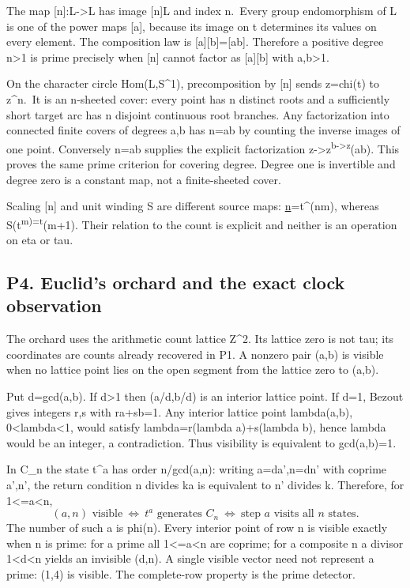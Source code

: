 \documentclass[
  11pt,
]{article}
\begin{document}
The map {[}n{]}:L-\textgreater L has image {[}n{]}L and index n.~Every
group endomorphism of L is one of the power maps {[}a{]}, because its
image on t determines its values on every element. The composition law
is {[}a{]}{[}b{]}={[}ab{]}. Therefore a positive degree n\textgreater1
is prime precisely when {[}n{]} cannot factor as {[}a{]}{[}b{]} with
a,b\textgreater1.

On the character circle Hom(L,S\^{}1), precomposition by {[}n{]} sends
z=chi(t) to z\^{}n.~It is an n-sheeted cover: every point has n distinct
roots and a sufficiently short target arc has n disjoint continuous root
branches. Any factorization into connected finite covers of degrees a,b
has n=ab by counting the inverse images of one point. Conversely n=ab
supplies the explicit factorization
z-\textgreater z\textsuperscript{b-\textgreater z}(ab). This proves the
same prime criterion for covering degree. Degree one is invertible and
degree zero is a constant map, not a finite-sheeted cover.

Scaling {[}n{]} and unit winding S are different source maps:
\href{t\%5Em}{n}=t\^{}(nm), whereas S(t\textsuperscript{m)=t}(m+1).
Their relation to the count is explicit and neither is an operation on
eta or tau.

\subsection{P4. Euclid's orchard and the exact clock
observation}\label{p4.-euclids-orchard-and-the-exact-clock-observation}

The orchard uses the arithmetic count lattice Z\^{}2. Its lattice zero
is not tau; its coordinates are counts already recovered in P1. A
nonzero pair (a,b) is visible when no lattice point lies on the open
segment from the lattice zero to (a,b).

Put d=gcd(\textbar a\textbar,\textbar b\textbar). If d\textgreater1 then
(a/d,b/d) is an interior lattice point. If d=1, Bezout gives integers
r,s with ra+sb=1. Any interior lattice point lambda(a,b),
0\textless lambda\textless1, would satisfy lambda=r(lambda a)+s(lambda
b), hence lambda would be an integer, a contradiction. Thus visibility
is equivalent to gcd(\textbar a\textbar,\textbar b\textbar)=1.

In C\_n the state t\^{}a has order n/gcd(a,n): writing a=da',n=dn' with
coprime a',n', the return condition n divides ka is equivalent to n'
divides k. Therefore, for 1\textless=a\textless n, \[
(a,n)\text{ visible}\ \Longleftrightarrow\ t^a\text{ generates }C_n
\ \Longleftrightarrow\ \text{step }a\text{ visits all }n\text{ states}.
\] The number of such a is phi(n). Every interior point of row n is
visible exactly when n is prime: for a prime all 1\textless=a\textless n
are coprime; for a composite n a divisor 1\textless d\textless n yields
an invisible (d,n). A single visible vector need not represent a prime:
(1,4) is visible. The complete-row property is the prime detector.
\end{document}
